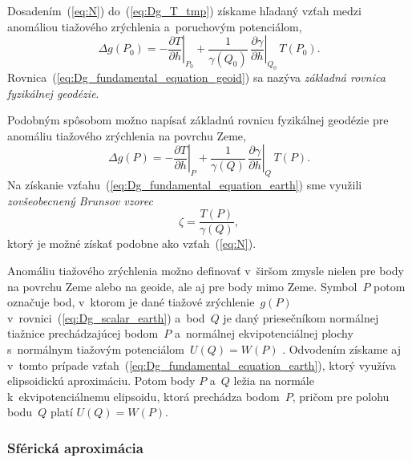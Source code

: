 \documentclass[a4paper,12pt]{book}
\begin{document}
Dosadením~(\ref{eq:N}) do~(\ref{eq:Dg_T_tmp}) získame hľadaný vzťah medzi 
anomáliou tiažového zrýchlenia a~poruchovým potenciálom,
%
\begin{equation}
\label{eq:Dg_fundamental_equation_geoid}
\Delta g(P_0) = -\left.\frac{\partial T}{\partial h}\right|_{P_0} 
+ \frac{1}{\gamma(Q_0)} \, \left.\frac{\partial \gamma}{\partial 
h}\right|_{Q_0} \, T(P_0){.}
\end{equation}
%
Rovnica~(\ref{eq:Dg_fundamental_equation_geoid}) sa nazýva \emph{základná 
rovnica fyzikálnej geodézie}.

Podobným spôsobom možno napísať základnú rovnicu fyzikálnej geodézie pre 
anomáliu tiažového zrýchlenia na povrchu Zeme,
%
\begin{equation}
\label{eq:Dg_fundamental_equation_earth}
\Delta g(P) = -\left.\frac{\partial T}{\partial h}\right|_{P} 
+ \frac{1}{\gamma(Q)} \, \left.\frac{\partial \gamma}{\partial h}\right|_{Q} \, 
T(P){.}
\end{equation}
%
Na získanie vzťahu~(\ref{eq:Dg_fundamental_equation_earth}) sme využili 
\emph{zovšeobecnený Brunsov vzorec}
%
\begin{equation}
\label{eq:zeta}
\zeta = \frac{T(P)}{\gamma(Q)}{,}
\end{equation}
%
ktorý je možné získať podobne ako vzťah~(\ref{eq:N}).

Anomáliu tiažového zrýchlenia možno definovať v~širšom zmysle nielen pre body 
na povrchu Zeme alebo na geoide, ale aj pre body mimo Zeme.  Symbol~$P$ potom 
označuje bod, v~ktorom je dané tiažové zrýchlenie~$g(P)$ 
v~rovnici~(\ref{eq:Dg_scalar_earth}) a~bod~$Q$ je daný priesečníkom normálnej 
tiažnice prechádzajúcej bodom~$P$ a~normálnej ekvipotenciálnej plochy 
s~normálnym tiažovým potenciálom~$U(Q) = W(P)$ 
\parencite{MoritzPhysicalGeodesy}.  Odvodením získame aj v~tomto prípade 
vzťah~(\ref{eq:Dg_fundamental_equation_earth}), ktorý využíva elipsoidickú 
aproximáciu.  Potom body $P$ a~$Q$ ležia na normále k~ekvipotenciálnemu 
elipsoidu, ktorá prechádza bodom~$P$, pričom pre polohu bodu~$Q$ platí $U(Q) 
= W(P)$.

\subsubsection{Sférická aproximácia}
\end{document}
